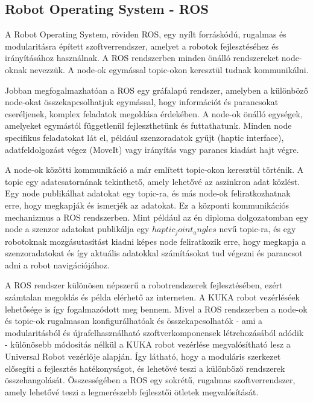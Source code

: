 \subsection{Robot Operating System - ROS}
A Robot Operating System, röviden ROS, egy nyílt forráskódú, rugalmas és modularitásra épített szoftverrendszer, amelyet a robotok fejlesztéséhez és irányításához használnak. A ROS rendszerben minden önálló rendszereket node-oknak nevezzük. A node-ok egymással topic-okon keresztül tudnak kommunikálni.

Jobban megfogalmazhatóan a ROS egy gráfalapú rendszer, amelyben a különböző node-okat összekapcsolhatjuk egymással, hogy információt és parancsokat cseréljenek, komplex feladatok megoldása érdekében. A node-ok önálló egységek, amelyeket egymástól függetlenül fejleszthetünk és futtathatunk. Minden node specifikus feladatokat lát el, például szenzoradatok gyűjt (haptic interface), adatfeldolgozást végez (MoveIt) vagy irányítás vagy parancs kiadást hajt végre.

A node-ok közötti kommunikáció a már említett topic-okon keresztül történik. A topic egy adatcsatornának tekinthető, amely lehetővé az aszinkron adat közlést. Egy node publikálhat adatokat egy topic-ra, és más node-ok feliratkozhatnak erre, hogy megkapják és ismerjék az adatokat. Ez a központi kommunikációs mechanizmus a ROS rendszerben. Mint például az én diploma dolgozatomban egy node a szenzor adatokat publikálja egy $haptic_joint_angles$ nevű topic-ra, és egy robotoknak mozgásutasítást kiadni képes node feliratkozik erre, hogy megkapja a szenzoradatokat és így aktuális adatokkal számításokat tud végezni és parancsot adni a robot navigációjához.

A ROS rendszer különösen népszerű a robotrendszerek fejlesztésében, ezért számtalan megoldás és példa elérhető az interneten. A KUKA robot vezérléséek lehetősége is így fogalmazódott meg bennem. Mivel a ROS rendszerben a node-ok és topic-ok rugalmasan konfigurálhatóak és összekapcsolhatók - ami a modularitásból és újrafelhasználható szoftverkomponensek létrehozásából adódik - különösebb módosítás nélkül a KUKA robot vezérlése megvalósítható lesz a Universal Robot vezérlője alapján. Így látható, hogy a moduláris szerkezet elősegíti a fejlesztés hatékonyságot, és lehetővé teszi a különböző rendszerek összehangolását. Összességében a ROS egy sokrétű, rugalmas szoftverrendszer, amely lehetővé teszi a legmerészebb fejlesztői ötletek megvalósítását.

